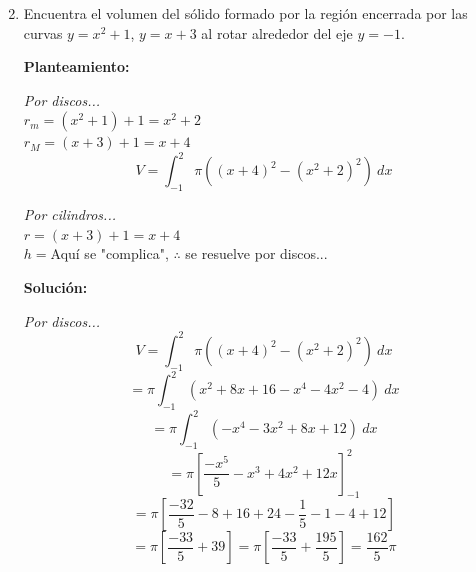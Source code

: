 \documentclass[10pt,letterpaper]{article}
\begin{document}
\begin{enumerate}
\begin{multicols}{2}
\end{multicols}

\item Encuentra el volumen del sólido formado por la región encerrada por las curvas $y=x^2 +1$,
      $y=x+3$ al rotar alrededor del eje $y = -1$.

\begin{multicols}{2}


\textbf{Planteamiento:}

\textit{Por discos...} \\
$r_m = (x^2 + 1) + 1 = x^2 + 2$ \\
$r_M = (x + 3) + 1 = x + 4$
$$V = \int_{-1}^{2} \pi ( (x+4)^2 - (x^2 + 2)^2 ) \ dx$$

\textit{Por cilindros...} \\
$r = (x+3)+1 = x+4$ \\
$h = $Aquí se "complica", $\therefore$ se resuelve por discos...

\textbf{Solución:}

\textit{Por discos...}
$$V = \int_{-1}^{2} \pi ( (x+4)^2 - (x^2 + 2)^2 ) \ dx$$
$$= \pi \int_{-1}^{2} (x^2 + 8x + 16 - x^4 - 4x^2 -4) \ dx$$
$$= \pi \int_{-1}^{2} (-x^4 -3x^2 + 8x + 12)\ dx$$
$$= \pi [\frac{-x^5}{5} - x^3 + 4x^2 + 12x]_{-1}^{2}$$
$$= \pi [\frac{-32}{5} - 8 + 16 + 24 - \frac{1}{5} - 1 - 4  + 12]$$
$$= \pi [\frac{-33}{5}+39] = \pi [\frac{-33}{5} + \frac{195}{5}] = \frac{162}{5}\pi$$


\end{multicols}
\end{enumerate}
\end{document}
